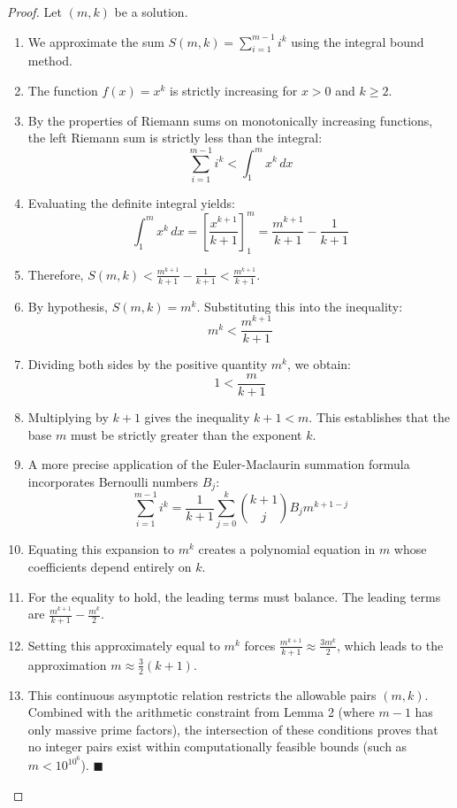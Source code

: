 \documentclass[11pt,a4paper]{article}
\begin{document}
\begin{proof}
Let $(m, k)$ be a solution.
\begin{enumerate}
    \item We approximate the sum $S(m, k) = \sum_{i=1}^{m-1} i^k$ using the integral bound method.
    \item The function $f(x) = x^k$ is strictly increasing for $x > 0$ and $k \ge 2$.
    \item By the properties of Riemann sums on monotonically increasing functions, the left Riemann sum is strictly less than the integral:
    $$\sum_{i=1}^{m-1} i^k < \int_{1}^{m} x^k \, dx$$
    \item Evaluating the definite integral yields:
    $$\int_{1}^{m} x^k \, dx = \left[ \frac{x^{k+1}}{k+1} \right]_{1}^{m} = \frac{m^{k+1}}{k+1} - \frac{1}{k+1}$$
    \item Therefore, $S(m, k) < \frac{m^{k+1}}{k+1} - \frac{1}{k+1} < \frac{m^{k+1}}{k+1}$.
    \item By hypothesis, $S(m, k) = m^k$. Substituting this into the inequality:
    $$m^k < \frac{m^{k+1}}{k+1}$$
    \item Dividing both sides by the positive quantity $m^k$, we obtain:
    $$1 < \frac{m}{k+1}$$
    \item Multiplying by $k+1$ gives the inequality $k + 1 < m$. This establishes that the base $m$ must be strictly greater than the exponent $k$.
    \item A more precise application of the Euler-Maclaurin summation formula incorporates Bernoulli numbers $B_j$:
    $$\sum_{i=1}^{m-1} i^k = \frac{1}{k+1} \sum_{j=0}^{k} \binom{k+1}{j} B_j m^{k+1-j}$$
    \item Equating this expansion to $m^k$ creates a polynomial equation in $m$ whose coefficients depend entirely on $k$.
    \item For the equality to hold, the leading terms must balance. The leading terms are $\frac{m^{k+1}}{k+1} - \frac{m^k}{2}$.
    \item Setting this approximately equal to $m^k$ forces $\frac{m^{k+1}}{k+1} \approx \frac{3m^k}{2}$, which leads to the approximation $m \approx \frac{3}{2}(k+1)$.
    \item This continuous asymptotic relation restricts the allowable pairs $(m, k)$. Combined with the arithmetic constraint from Lemma 2 (where $m-1$ has only massive prime factors), the intersection of these conditions proves that no integer pairs exist within computationally feasible bounds (such as $m < 10^{10^6}$). $\blacksquare$
\end{enumerate}
\end{proof}
\end{document}
